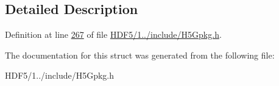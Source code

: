 \subsection{Detailed Description}


Definition at line \hyperlink{_h_d_f5_21_810_81_2include_2_h5_gpkg_8h_source_l00267}{267} of file \hyperlink{_h_d_f5_21_810_81_2include_2_h5_gpkg_8h_source}{H\+D\+F5/1../include/\+H5\+Gpkg.\+h}.



The documentation for this struct was generated from the following file\+:\begin{DoxyCompactItemize}
\item 
H\+D\+F5/1../include/\+H5\+Gpkg.\+h\end{DoxyCompactItemize}
